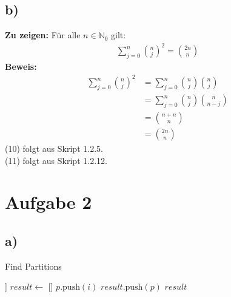 \documentclass[a4paper]{scrartcl}
\begin{document}
\subsection*{b)}
\textbf{Zu zeigen:} Für alle $ n \in \mathbb{N}_0$ gilt:
\begin{align*}
    \sum_{j=0}^{n} \binom{n}{j}^2 = \binom{2n}{n}
\end{align*}
\textbf{Beweis:} 
\begin{align}
    \sum_{j=0}^{n} \binom{n}{j}^2 &= \sum_{j=0}^{n} \binom{n}{j} \binom{n}{j} \\
    &= \sum_{j=0}^{n} \binom{n}{j} \binom{n}{n-j} \\
    &= \binom{n+n}{n} \\
    &= \binom{2n}{n}
\end{align}
(10) folgt aus Skript 1.2.5. \\
(11) folgt aus Skript 1.2.12. 

\section*{Aufgabe 2}

\subsection*{a)}
\begin{algorithm}
\caption{Find Partitions}\label{euclid}
\begin{algorithmic}[1]
        \Return [[n]] 
    \EndIf
    \State $result \gets$ []
                \State $p.\text{push}(i)$
                \State $result.\text{push}(p)$
            \EndIf
        \EndFor
    \EndFor
    \State \Return $result$
    \EndProcedure
\end{algorithmic}
\end{algorithm}
\newpage
\end{document}
